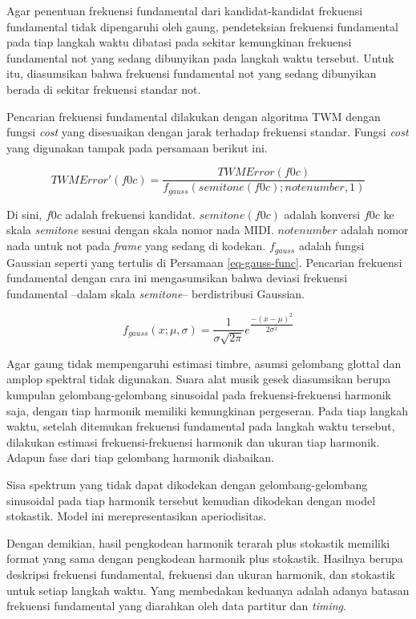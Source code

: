 Agar penentuan frekuensi fundamental dari kandidat-kandidat frekuensi fundamental tidak dipengaruhi oleh gaung, pendeteksian frekuensi fundamental pada tiap langkah waktu dibatasi pada sekitar kemungkinan frekuensi fundamental not yang sedang dibunyikan pada langkah waktu tersebut. Untuk itu, diasumsikan bahwa frekuensi fundamental not yang sedang dibunyikan berada di sekitar frekuensi standar not.

Pencarian frekuensi fundamental dilakukan dengan algoritma TWM dengan fungsi \textit{cost} yang disesuaikan dengan jarak terhadap frekuensi standar. Fungsi \textit{cost} yang digunakan tampak pada persamaan berikut ini.

\begin{equation}
  TWMError'(f0c) = \dfrac{TWMError(f0c)}{f_{gauss}(semitone(f0c);notenumber,1)}
\end{equation}

Di sini, $f0c$ adalah frekuensi kandidat. $semitone(f0c)$ adalah konversi $f0c$ ke skala \textit{semitone} sesuai dengan skala nomor nada MIDI. $notenumber$ adalah nomor nada untuk not pada \textit{frame} yang sedang di kodekan. $f_{gauss}$ adalah fungsi Gaussian seperti yang tertulis di Persamaan \ref{eq-gauss-func}. Pencarian frekuensi fundamental dengan cara ini mengasumsikan bahwa deviasi frekuensi fundamental --dalam skala \textit{semitone}-- berdistribusi Gaussian.

\begin{equation}
 f_{gauss}(x;\mu,\sigma) = \dfrac{1}{\sigma \sqrt{2\pi}}e^{\dfrac{-(x-\mu)^2}{2 \sigma^2}} \label{eq-gauss-func}
\end{equation}

Agar gaung tidak mempengaruhi estimasi timbre, asumsi gelombang glottal dan amplop spektral tidak digunakan. Suara alat musik gesek diasumsikan berupa kumpulan gelombang-gelombang sinusoidal pada frekuensi-frekuensi harmonik saja, dengan tiap harmonik memiliki kemungkinan pergeseran. Pada tiap langkah waktu, setelah ditemukan frekuensi fundamental pada langkah waktu tersebut, dilakukan estimasi frekuensi-frekuensi harmonik dan ukuran tiap harmonik. Adapun fase dari tiap gelombang harmonik diabaikan.

Sisa spektrum yang tidak dapat dikodekan dengan gelombang-gelombang sinusoidal pada tiap harmonik tersebut kemudian dikodekan dengan model stokastik. Model ini merepresentasikan aperiodisitas.

Dengan demikian, hasil pengkodean harmonik terarah plus stokastik memiliki format yang sama dengan pengkodean harmonik plus stokastik. Hasilnya berupa deskripsi frekuensi fundamental, frekuensi dan ukuran harmonik, dan stokastik untuk setiap langkah waktu. Yang membedakan keduanya adalah adanya batasan frekuensi fundamental yang diarahkan oleh data partitur dan \textit{timing}.

